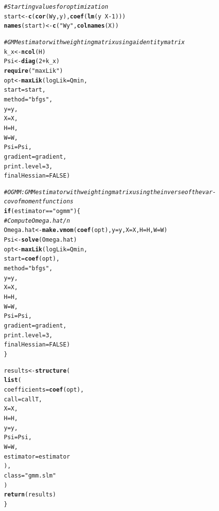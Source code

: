\documentclass[english,12pt]{book}\usepackage[]{graphicx}\usepackage[]{xcolor}
\makeatletter
\newcommand{\hlnum}[1]{\textcolor[rgb]{0.686,0.059,0.569}{#1}}%
\newcommand{\hlstr}[1]{\textcolor[rgb]{0.192,0.494,0.8}{#1}}%
\newcommand{\hlcom}[1]{\textcolor[rgb]{0.678,0.584,0.686}{\textit{#1}}}%
\newcommand{\hlopt}[1]{\textcolor[rgb]{0,0,0}{#1}}%
\newcommand{\hlstd}[1]{\textcolor[rgb]{0.345,0.345,0.345}{#1}}%
\newcommand{\hlkwa}[1]{\textcolor[rgb]{0.161,0.373,0.58}{\textbf{#1}}}%
\newcommand{\hlkwb}[1]{\textcolor[rgb]{0.69,0.353,0.396}{#1}}%
\newcommand{\hlkwc}[1]{\textcolor[rgb]{0.333,0.667,0.333}{#1}}%
\newcommand{\hlkwd}[1]{\textcolor[rgb]{0.737,0.353,0.396}{\textbf{#1}}}%
\newenvironment{kframe}{%
 \def\at@end@of@kframe{}%
 \ifinner\ifhmode%
  \def\at@end@of@kframe{\end{minipage}}%
  \begin{minipage}{\columnwidth}%
 \fi\fi%
 \def\FrameCommand##1{\hskip\@totalleftmargin \hskip-\fboxsep
 \colorbox{shadecolor}{##1}\hskip-\fboxsep
     \hskip-\linewidth \hskip-\@totalleftmargin \hskip\columnwidth}%
 \MakeFramed {\advance\hsize-\width
   \@totalleftmargin\z@ \linewidth\hsize
   \@setminipage}}%
 {\par\unskip\endMakeFramed%
 \at@end@of@kframe}
\newenvironment{knitrout}{}{} %
\makeatother
\begin{document}
\begin{knitrout}
\begin{kframe}
\begin{alltt}
  \hlcom{# Starting values for optimization}
  \hlstd{start} \hlkwb{<-} \hlkwd{c}\hlstd{(}\hlkwd{cor}\hlstd{(Wy, y),} \hlkwd{coef}\hlstd{(}\hlkwd{lm}\hlstd{(y} \hlopt{~} \hlstd{X} \hlopt{-} \hlnum{1}\hlstd{)))}
  \hlkwd{names}\hlstd{(start)} \hlkwb{<-} \hlkwd{c}\hlstd{(}\hlstr{"Wy"}\hlstd{,} \hlkwd{colnames}\hlstd{(X))}

  \hlcom{# GMM estimator with weighting matrix using a identity matrix  }
  \hlstd{k_x} \hlkwb{<-} \hlkwd{ncol}\hlstd{(H)}
  \hlstd{Psi} \hlkwb{<-} \hlkwd{diag}\hlstd{(}\hlnum{2} \hlopt{+} \hlstd{k_x)}
  \hlkwd{require}\hlstd{(}\hlstr{"maxLik"}\hlstd{)}
  \hlstd{opt} \hlkwb{<-} \hlkwd{maxLik}\hlstd{(}\hlkwc{logLik} \hlstd{= Qmin,}
                \hlkwc{start} \hlstd{= start,}
                \hlkwc{method} \hlstd{=} \hlstr{"bfgs"}\hlstd{,}
                \hlkwc{y} \hlstd{= y,}
                \hlkwc{X} \hlstd{= X,}
                \hlkwc{H} \hlstd{= H,}
                \hlkwc{W} \hlstd{= W,}
                \hlkwc{Psi} \hlstd{= Psi,}
                \hlkwc{gradient} \hlstd{= gradient,}
                \hlkwc{print.level} \hlstd{=} \hlnum{3}\hlstd{,}
                \hlkwc{finalHessian} \hlstd{=} \hlnum{FALSE}\hlstd{)}

  \hlcom{# OGMM: GMM estimator with weighting matrix using the inverse of the var-cov of moment functions}
  \hlkwa{if} \hlstd{(estimator} \hlopt{==} \hlstr{"ogmm"}\hlstd{)\{}
    \hlcom{# Compute Omega.hat/n}
    \hlstd{Omega.hat} \hlkwb{<-} \hlkwd{make.vmom}\hlstd{(}\hlkwd{coef}\hlstd{(opt),} \hlkwc{y} \hlstd{= y,} \hlkwc{X} \hlstd{= X,} \hlkwc{H} \hlstd{= H,} \hlkwc{W} \hlstd{= W)}
    \hlstd{Psi}  \hlkwb{<-} \hlkwd{solve}\hlstd{(Omega.hat)}
    \hlstd{opt} \hlkwb{<-} \hlkwd{maxLik}\hlstd{(}\hlkwc{logLik} \hlstd{= Qmin,}
                  \hlkwc{start} \hlstd{=} \hlkwd{coef}\hlstd{(opt),}
                  \hlkwc{method} \hlstd{=} \hlstr{"bfgs"}\hlstd{,}
                  \hlkwc{y} \hlstd{= y,}
                  \hlkwc{X} \hlstd{= X,}
                  \hlkwc{H} \hlstd{= H,}
                  \hlkwc{W} \hlstd{= W,}
                  \hlkwc{Psi} \hlstd{= Psi,}
                  \hlkwc{gradient} \hlstd{= gradient,}
                  \hlkwc{print.level} \hlstd{=} \hlnum{3}\hlstd{,}
                  \hlkwc{finalHessian} \hlstd{=} \hlnum{FALSE}\hlstd{)}
  \hlstd{\}}


  \hlstd{results} \hlkwb{<-} \hlkwd{structure}\hlstd{(}
    \hlkwd{list}\hlstd{(}
      \hlkwc{coefficients} \hlstd{=} \hlkwd{coef}\hlstd{(opt),}
      \hlkwc{call} \hlstd{= callT,}
      \hlkwc{X} \hlstd{= X,}
      \hlkwc{H} \hlstd{= H,}
      \hlkwc{y} \hlstd{= y,}
      \hlkwc{Psi} \hlstd{= Psi,}
      \hlkwc{W} \hlstd{= W,}
      \hlkwc{estimator} \hlstd{= estimator}
    \hlstd{),}
    \hlkwc{class} \hlstd{=} \hlstr{"gmm.slm"}
  \hlstd{)}
  \hlkwd{return}\hlstd{(results)}
\hlstd{\}}
\end{alltt}
\end{kframe}
\end{knitrout}
\end{document}
